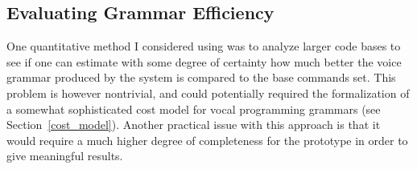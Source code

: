 \documentclass[../thesis.tex]{subfiles}
\begin{document}
\subsection{Evaluating Grammar Efficiency}
One quantitative method I considered using was to analyze larger code bases
to see if one can estimate with some degree of certainty how much better the voice grammar
produced by the system is compared to the base commands set.
This problem is however nontrivial, and could potentially
required the formalization of a somewhat sophisticated cost model for vocal programming grammars (see Section~\ref{cost_model}).
Another practical issue with this approach is that it would require a much higher degree of completeness for the prototype
in order to give meaningful results.



\end{document}
